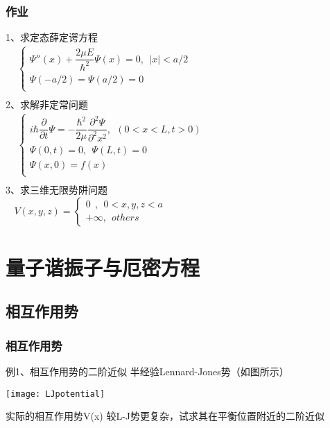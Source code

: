 \begin{frame}
	\frametitle{作业}
	1、求定态薛定谔方程\\ 
	$\begin{array}{lllllllll}
		& \begin{cases}
			\Psi'' (x) +\dfrac{2\mu E}{\hbar ^2} \Psi(x) =0,~~ |x|<a/2 \\
			\Psi(-a/2) =\Psi(a/2) =0\\
		\end{cases}\\	
	\end{array}$ \\ 
	2、求解非定常问题\\
	$\begin{array}{lllllllll}
		& \begin{cases}
			i\hbar \dfrac{\partial }{\partial t} \Psi = -\dfrac{\hbar^2}{2\mu } \dfrac{\partial ^2 \Psi }{\partial ^2  x ^2 } , ~~ (0<x<L, t>0) \\
			\Psi (0,t) =0, ~~ \Psi (L,t) =0 \\
			\Psi (x,0) =f(x)  \\
		\end{cases}\\
	\end{array}$ \\ 
	3、求三维无限势阱问题\\
	$ ~~~~	V(x,y,z)=\left \{ 
	\begin{array}{cccc}
		0	~~ ,~~ 0<x,y,z<a \\  
		+\infty ,~~others\
	\end{array}
	\right. $ 	
\end{frame}

\section{量子谐振子与厄密方程}

\subsection{相互作用势}

\begin{frame}
	\frametitle{相互作用势}
	\begin{exampleblock} {例1、相互作用势的二阶近似}
		半经验Lennard-Jones势（如图所示）\\
	   \centerline{\texttt{[image: LJpotential]}}  
		实际的相互作用势V(x) 较L-J势更复杂，试求其在平衡位置附近的二阶近似	
	\end{exampleblock}
\end{frame}

